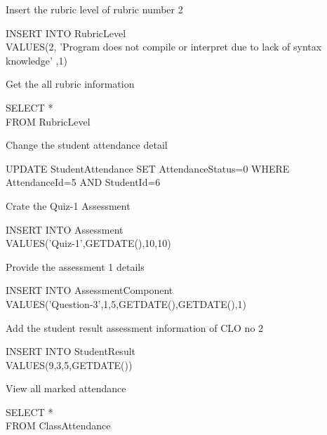 \documentclass[10pt,a4paper]{article}
\newenvironment{problem}[2][Problem]{\begin{trivlist}
\item[\hskip \labelsep {\bfseries #1}\hskip \labelsep {\bfseries #2.}]}{\end{trivlist}}
\begin{document}
\begin{problem}{24}
Insert the rubric level of rubric number 2 
\end{problem}
INSERT INTO RubricLevel\\ VALUES(2,
'Program does not compile or interpret due to lack of syntax knowledge'
,1)
\begin{problem}{25}
Get the all rubric information  
\end{problem}
SELECT * \\
FROM RubricLevel\\
\begin{problem}{26}
Change the student attendance detail 
\end{problem}
UPDATE StudentAttendance SET AttendanceStatus=0 WHERE \\ AttendanceId=5 AND StudentId=6 

\begin{problem}{27}
Crate the Quiz-1 Assessment 
\end{problem}
INSERT INTO Assessment \\VALUES('Quiz-1',GETDATE(),10,10)

\begin{problem}{28}
Provide the assessment 1 details 
\end{problem}
INSERT INTO AssessmentComponent \\ VALUES('Question-3',1,5,GETDATE(),GETDATE(),1)

\begin{problem}{29}
Add the student result assessment information of CLO no 2 
\end{problem}
INSERT INTO StudentResult \\VALUES(9,3,5,GETDATE())
\begin{problem}{30}
View all marked attendance 
\end{problem}
SELECT * \\
FROM ClassAttendance
\end{document}
